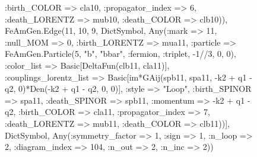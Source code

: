\documentclass{revtex4}
\begin{document}
\begin{figure}[!htb]
\begin{center}
{:birth_COLOR => cla10, :propagator_index => 6, :death_LORENTZ => mub10, :death_COLOR => clb10)), FeAmGen.Edge(11, 10, 9, Dict{Symbol, Any}(:mark => 11, :null_MOM => 0, :birth_LORENTZ => mua11, :particle => FeAmGen.Particle(5, "b", "bbar", :fermion, :triplet, -1//3, 0, 0), :color_list => Basic[DeltaFun(clb11, cla11)], :couplings_lorentz_list => Basic[im*GAij(spb11, spa11, -k2 + q1 - q2, 0)*Den(-k2 + q1 - q2, 0, 0)], :style => "Loop", :birth_SPINOR => spa11, :death_SPINOR => spb11, :momentum => -k2 + q1 - q2, :birth_COLOR => cla11, :propagator_index => 7, :death_LORENTZ => mub11, :death_COLOR => clb11))], Dict{Symbol, Any}(:symmetry_factor => 1, :sign => 1, :n_loop => 2, :diagram_index => 104, :n_out => 2, :n_inc => 2)) 
}
\end{center}
\end{figure}
\end{document}
